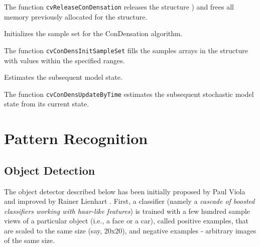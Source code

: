 The function \texttt{cvReleaseConDensation} releases the structure ) and frees all memory previously allocated for the structure.

\label{ConDensInitSampleSet}

Initializes the sample set for the ConDensation algorithm.


\begin{description}
\end{description}

The function \texttt{cvConDensInitSampleSet} fills the samples arrays in the structure  with values within the specified ranges.

\label{ConDensUpdateByTime}

Estimates the subsequent model state.


\begin{description}
\end{description}

The function \texttt{cvConDensUpdateByTime} estimates the subsequent stochastic model state from its current state.

\section{Pattern Recognition}

\subsection{Object Detection}

The object detector described below has been initially proposed by Paul Viola
and improved by Rainer Lienhart
. First, a classifier (namely a \emph{cascade of boosted classifiers working with haar-like features}) is trained with a few hundred sample views of a particular object (i.e., a face or a car), called positive examples, that are scaled to the same size (say, 20x20), and negative examples - arbitrary images of the same size.

